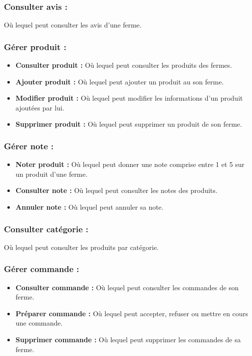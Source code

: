 \documentclass[16pt,fleqn]{article} %
\begin{document}
\subsubsection{Consulter avis :}
Où lequel peut consulter les avis d'une ferme.

\subsubsection{Gérer produit :}
\begin{itemize}
    \item \textbf{Consulter produit :} Où lequel peut consulter les produits des fermes.
    \item \textbf{Ajouter produit :} Où lequel peut ajouter un produit au son ferme.
    \item \textbf{Modifier produit :} Où lequel peut modifier les informations d'un produit ajoutées par lui.
    \item \textbf{Supprimer produit :} Où lequel peut supprimer un produit de son ferme.
\end{itemize}

\subsubsection{Gérer note :}
\begin{itemize}
    \item \textbf{Noter produit :} Où lequel peut donner une note comprise entre 1 et 5 sur un produit d'une ferme.
    \item \textbf{Consulter note :} Où lequel peut consulter les notes des produits.
    \item \textbf{Annuler note :} Où lequel peut annuler sa note.
\end{itemize}

\subsubsection{Consulter catégorie :}
Où lequel peut consulter les produits par catégorie.
    
\subsubsection{Gérer commande :}
    \begin{itemize}
        \item \textbf{Consulter commande :} Où lequel peut consulter les commandes de son ferme.
        \item \textbf{Préparer commande :} Où lequel peut accepter, refuser ou mettre en cours une commande.
        \item \textbf{Supprimer commande :} Où lequel peut supprimer les commandes de sa ferme.
    \end{itemize}
    
\end{document}
